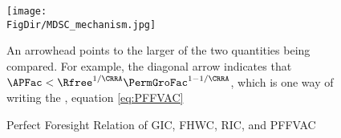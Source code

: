 \begin{figure}
  \centerline{\texttt{[image: \\FigDir/MDSC\_mechanism.jpg]}}
  \caption{Perfect Foresight Relation of {GIC}, {FHWC}, {RIC}, and {PFFVAC}}
  \footnotesize{An arrowhead points to the larger of the two quantities being compared.  For example, the diagonal arrow indicates that $\APFac < \Rfree^{1/\CRRA}\PermGroFac^{1-1/\CRRA}$, which is one way of writing the {\PFFVAC}, equation \eqref{eq:PFFVAC}}
\end{figure}

